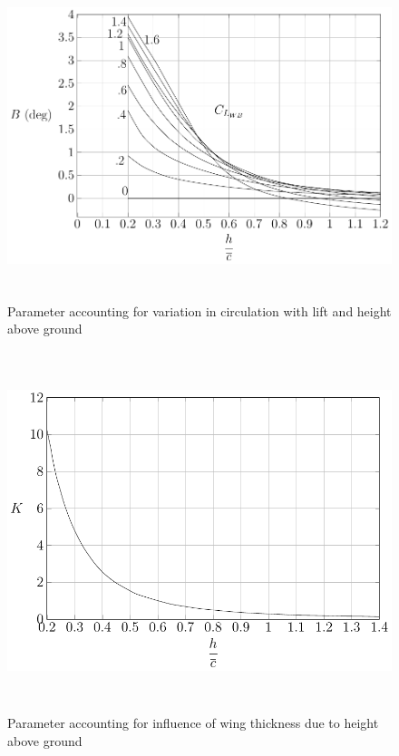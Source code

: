 \begin{figure}[H]
	\includegraphics[height=9.5cm, keepaspectratio ]{Immagini/Capitolo2/2_14-(Delta_alpha_G)_B_vs_h_frac_overline_c_C_L_WB} 
	\caption{Parameter accounting for variation in circulation with lift and height above ground} %
	\label{fig:figura2_14} %
\end{figure}

\begin{figure}[H]
	\centering
	\includegraphics[height=10.5cm, keepaspectratio ]{Immagini/Capitolo2/2_15-Delta_alpha_G_K_vs_h_frac_c} 
	\caption{Parameter accounting for influence of wing thickness due to height above ground} %
	\label{fig:figura2_15} %
\end{figure}


